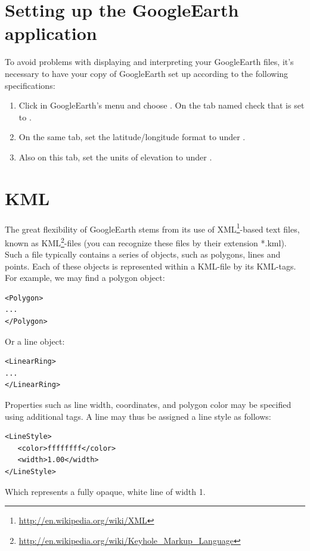 \section{Setting up the GoogleEarth application}
To avoid problems with displaying and interpreting your GoogleEarth files, it's necessary to have your copy of GoogleEarth set up according to the following specifications:
\begin{enumerate}
\item Click  in GoogleEarth's menu and choose . On the tab named  check that  is set to .
\item On the same tab, set the latitude/longitude format to  under .
\item Also on this tab, set the units of elevation to  under .
\end{enumerate}



\section{KML}
The great flexibility of GoogleEarth stems from its use of XML\footnote{\url{http://en.wikipedia.org/wiki/XML}}-based text files, known as KML\footnote{\url{http://en.wikipedia.org/wiki/Keyhole_Markup_Language}}-files (you can recognize these files by their extension *.kml). Such a file typically contains a series of objects, such as polygons, lines and points. Each of these objects is represented within a KML-file by its KML-tags. For example, we may find a polygon object:
\begin{verbatim}
<Polygon>
...
</Polygon>
\end{verbatim}
Or a line object:
\begin{verbatim}
<LinearRing>
...
</LinearRing>
\end{verbatim}
\vspace{1em}

\noindent Properties such as line width, coordinates, and polygon color may be specified using additional tags. A line may thus be assigned a line style as follows:
\begin{verbatim}
<LineStyle>
   <color>ffffffff</color>
   <width>1.00</width>
</LineStyle>
\end{verbatim}
Which represents a fully opaque, white line of width 1.

